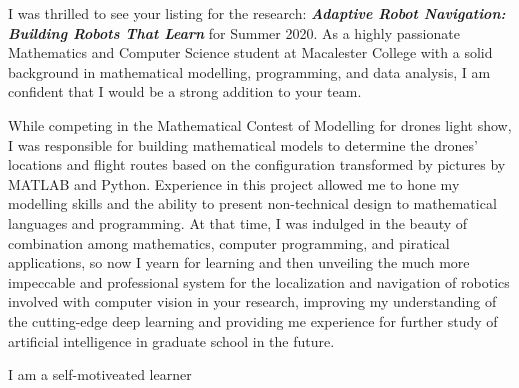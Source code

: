\documentclass[11pt, a4paper]{awesome-cv}
\begin{document}
\makecvheader[L]


\makelettertitle

\begin{cvletter}
I was thrilled to see your listing for the research: \textit{\textbf{Adaptive Robot Navigation: Building Robots That Learn}} for Summer 2020. As a highly passionate Mathematics and Computer Science student at Macalester College with a solid background in mathematical modelling, programming, and data analysis, I am confident that I would be a strong addition to your team.


While competing in the Mathematical Contest of Modelling for drones light show, I was responsible for building mathematical models to determine the drones' locations and flight routes based on the configuration transformed by pictures by MATLAB and Python. Experience in this project allowed me to hone my modelling skills and the ability to present non-technical design to mathematical languages and programming. At that time, I was indulged in the beauty of combination among mathematics, computer programming, and piratical applications, so now I yearn for learning and then unveiling the much more impeccable and professional system for the localization and navigation of robotics involved with computer vision in your research, improving my understanding of the cutting-edge deep learning and providing me experience for further study of artificial intelligence in graduate school in the future.


I am a self-motiveated learner 


\end{cvletter}


\makeletterclosing
\end{document}

